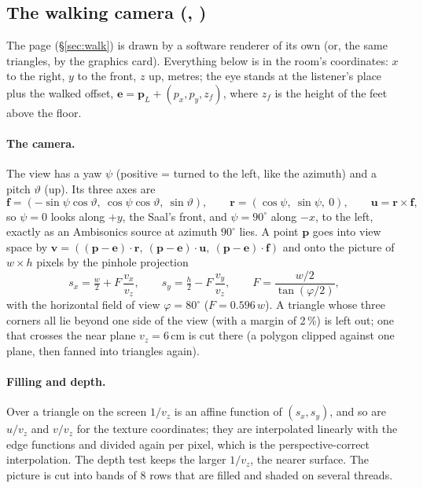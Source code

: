 \subsection{The walking camera (, )}
\label{sec:math-walk}
The page  (\S\ref{sec:walk}) is drawn by a software renderer of its own (or, the same triangles, by the
graphics card). Everything below is in the room's coordinates: $x$ to the right, $y$ to the front, $z$ up, metres; the
eye stands at the listener's place plus the walked offset, $\mathbf e = \mathbf p_L + (p_x, p_y, z_f)$, where $z_f$ is
the height of the feet above the floor.

\paragraph{The camera.} The view has a yaw $\psi$ (positive = turned to the left, like the azimuth) and a pitch
$\vartheta$ (up). Its three axes are
\begin{equation}
  \mathbf f = (-\sin\psi\cos\vartheta,\ \cos\psi\cos\vartheta,\ \sin\vartheta),\qquad
  \mathbf r = (\cos\psi,\ \sin\psi,\ 0),\qquad
  \mathbf u = \mathbf r\times\mathbf f ,
\end{equation}
so $\psi = 0$ looks along $+y$, the Saal's front, and $\psi = 90^\circ$ along $-x$, to the left, exactly as an
Ambisonics source at azimuth $90^\circ$ lies. A point $\mathbf p$ goes into view space by
$\mathbf v = ((\mathbf p-\mathbf e)\cdot\mathbf r,\ (\mathbf p-\mathbf e)\cdot\mathbf u,\ (\mathbf p-\mathbf e)\cdot\mathbf f)$
and onto the picture of $w\times h$ pixels by the pinhole projection
\begin{equation}
  s_x = \tfrac w2 + F\,\frac{v_x}{v_z},\qquad s_y = \tfrac h2 - F\,\frac{v_y}{v_z},\qquad
  F = \frac{w/2}{\tan(\varphi/2)},
\end{equation}
with the horizontal field of view $\varphi = 80^\circ$ ($F = 0.596\,w$). A triangle whose three corners all lie beyond
one side of the view (with a margin of 2\,\%) is left out; one that crosses the near plane $v_z = 6$\,cm is cut there
(a polygon clipped against one plane, then fanned into triangles again).

\paragraph{Filling and depth.} Over a triangle on the screen $1/v_z$ is an affine function of $(s_x, s_y)$, and so are
$u/v_z$ and $v/v_z$ for the texture coordinates; they are interpolated linearly with the edge functions and divided
again per pixel, which is the perspective-correct interpolation. The depth test keeps the larger $1/v_z$, the nearer
surface. The picture is cut into bands of 8 rows that are filled and shaded on several threads.

